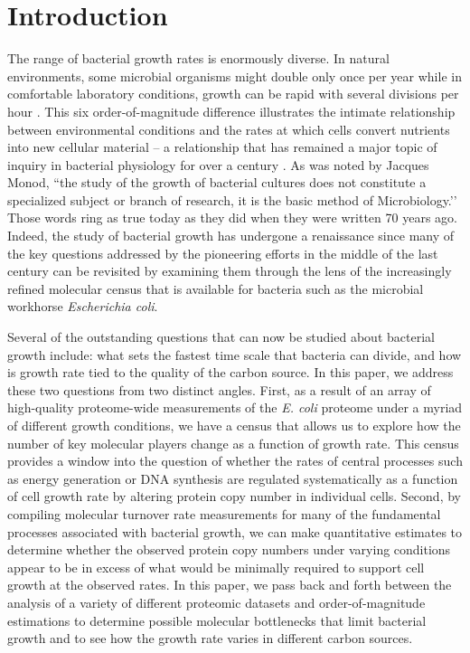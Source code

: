 \section{Introduction}
The range of bacterial growth rates is enormously diverse. In natural
environments, some microbial organisms might double only once per year \citep{mikucki2009} while
in comfortable laboratory conditions, growth can be rapid with several
divisions per hour \citep{schaechter1958}. This six order-of-magnitude difference illustrates the
intimate relationship between environmental conditions and the rates at which
cells convert nutrients into new cellular material -- a relationship that has
remained a major topic of inquiry in bacterial physiology for over a century
\citep{jun2018}. As was noted by Jacques Monod, ``the study of the growth of
bacterial cultures does not constitute a specialized subject or branch of
research, it is the basic method of Microbiology.’’ \citep{monod1949} Those words ring as true
today as they did when they were written 70 years ago. Indeed, the study of
bacterial growth has undergone a renaissance since many of the key
questions addressed by the pioneering efforts in the middle of the last
century can be revisited by examining them through the lens of the
increasingly refined molecular census that is available for bacteria such as
the microbial workhorse \textit{Escherichia coli}.

Several of the outstanding
questions that can now be studied about bacterial growth include: what sets
the fastest time scale that bacteria can divide, and how is growth rate tied
to the quality of the carbon source. In this paper, we address these two
questions from two distinct angles. First, as a result of an array of
high-quality proteome-wide measurements of the \textit{E. coli} proteome
under a myriad of different growth conditions, we have a census that allows
us to explore how the number of key molecular players change as a function of
growth rate. This census provides a window into the question of whether the rates of central processes such as energy generation or DNA synthesis are regulated systematically as a function of cell growth rate by altering protein copy number in individual cells.
Second, by compiling molecular turnover rate measurements for many of the fundamental processes associated with bacterial growth, we can make quantitative estimates to determine whether the observed protein copy numbers under varying conditions appear to be in excess of what would be minimally required to support cell growth at the observed rates.
In this paper, we pass back
and forth between the analysis of a variety of different proteomic datasets
and order-of-magnitude estimations to determine possible molecular
bottlenecks that limit bacterial growth and to see how the growth rate varies
in different carbon sources.

